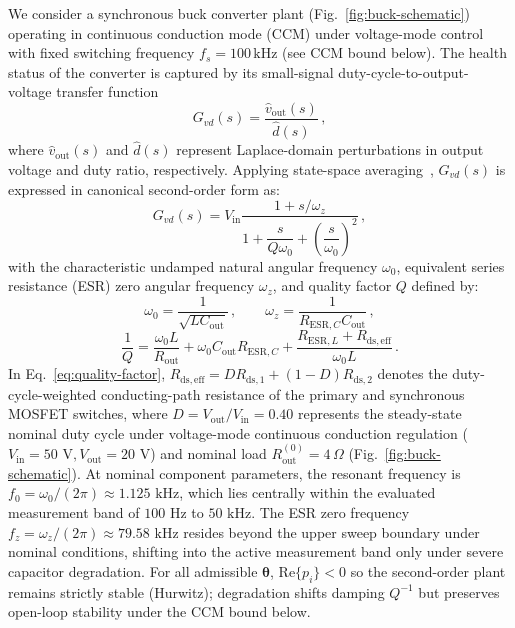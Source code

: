 \documentclass[11pt,a4paper]{article}
\begin{document}
We consider a synchronous buck converter plant (Fig.~\ref{fig:buck-schematic}) operating in continuous conduction mode (CCM) under voltage-mode control with fixed switching frequency $f_{s}=100\,\text{kHz}$ (see CCM bound below). The health status of the converter is captured by its small-signal duty-cycle-to-output-voltage transfer function
\begin{equation}
G_{vd}(s) = \frac{\hat{v}_{\mathrm{out}}(s)}{\hat{d}(s)}\,,
\label{eq:gvd-def}
\end{equation}
where $\hat{v}_{\mathrm{out}}(s)$ and $\hat{d}(s)$ represent Laplace-domain perturbations in output voltage and duty ratio, respectively. Applying state-space averaging~\cite{erickson2001fundamentals}, $G_{vd}(s)$ is expressed in canonical second-order form as:
\begin{equation}
G_{vd}(s) = V_{\mathrm{in}} \frac{1 + s/\omega_z}{1 + \dfrac{s}{Q\omega_0} + \left(\dfrac{s}{\omega_0}\right)^2}\,,
\label{eq:gvd}
\end{equation}
with the characteristic undamped natural angular frequency $\omega_0$, equivalent series resistance (ESR) zero angular frequency $\omega_z$, and quality factor $Q$ defined by:
\begin{equation}
\omega_0 = \frac{1}{\sqrt{L C_{\mathrm{out}}}}\,, \qquad
\omega_z = \frac{1}{R_{\mathrm{ESR},C} C_{\mathrm{out}}}\,,
\label{eq:corner-freqs-w}
\end{equation}
\begin{equation}
\frac{1}{Q} = \frac{\omega_0 L}{R_{\mathrm{out}}} + \omega_0 C_{\mathrm{out}} R_{\mathrm{ESR},C} + \frac{R_{\mathrm{ESR},L} + R_{\mathrm{ds},\mathrm{eff}}}{\omega_0 L}\,.
\label{eq:quality-factor}
\end{equation}
In Eq.~\eqref{eq:quality-factor}, $R_{\mathrm{ds},\mathrm{eff}} = D R_{\mathrm{ds},1} + (1-D) R_{\mathrm{ds},2}$ denotes the duty-cycle-weighted conducting-path resistance of the primary and synchronous MOSFET switches, where $D = V_{\mathrm{out}}/V_{\mathrm{in}} = 0.40$ represents the steady-state nominal duty cycle under voltage-mode continuous conduction regulation ($V_{\mathrm{in}}=50\text{ V}, V_{\mathrm{out}}=20\text{ V}$) and nominal load $R_{\mathrm{out}}^{(0)}=4\,\Omega$ (Fig.~\ref{fig:buck-schematic}). At nominal component parameters, the resonant frequency is $f_0 = \omega_0 / (2\pi) \approx 1.125\text{ kHz}$, which lies centrally within the evaluated measurement band of $100\text{ Hz}$ to $50\text{ kHz}$. The ESR zero frequency $f_z = \omega_z / (2\pi) \approx 79.58\text{ kHz}$ resides beyond the upper sweep boundary under nominal conditions, shifting into the active measurement band only under severe capacitor degradation. For all admissible $\boldsymbol{\theta}$, $\mathrm{Re}\{p_i\}<0$ so the second-order plant remains strictly stable (Hurwitz); degradation shifts damping $Q^{-1}$ but preserves open-loop stability under the CCM bound below.
\end{document}
